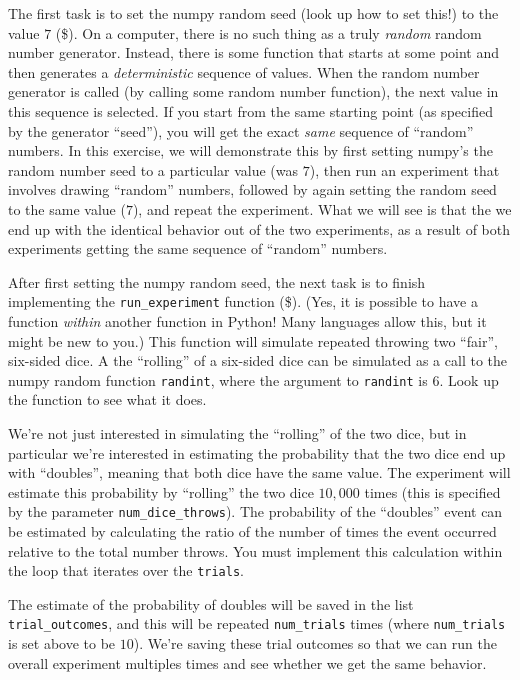 \documentclass[10pt]{article}
\begin{document}
\begin{enumerate}
The first task is to set the numpy random seed (look up how to set this!) to the value $7$ (\$). On a computer, there is no such thing as a truly {\em random} random number generator. Instead, there is some function that starts at some point and then generates a {\em deterministic} sequence of values. When the random number generator is called (by calling some random number function), the next value in this sequence is selected. If you start from the same starting point (as specified by the generator ``seed''), you will get the exact {\em same} sequence of ``random'' numbers. In this exercise, we will demonstrate this by first setting numpy's the random number seed to a particular value (was $7$), then run an experiment that involves drawing ``random'' numbers, followed by again setting the random seed to the same value ($7$), and repeat the experiment. What we will see is that the we end up with the identical behavior out of the two experiments, as a result of both experiments getting the same sequence of ``random'' numbers.

After first setting the numpy random seed, the next task is to finish implementing the {\tt run\_experiment} function (\$). (Yes, it is possible to have a function {\em within} another function in Python! Many languages allow this, but it might be new to you.)
This function will simulate repeated throwing two ``fair'', six-sided dice. A the ``rolling'' of a six-sided dice can be simulated as a call to the numpy random function {\tt randint}, where the argument to {\tt randint} is $6$. Look up the function to see what it does.

We're not just interested in simulating the ``rolling'' of the two dice, but in particular we're interested in estimating the probability that the two dice end up with ``doubles'', meaning that both dice have the same value. The experiment will estimate this probability by ``rolling'' the two dice $10,000$ times (this is specified by the parameter {\tt num\_dice\_throws}). The probability of the ``doubles'' event can be estimated by calculating the ratio of the number of times the event occurred relative to the total number throws. You must implement this calculation within the loop that iterates over the {\tt trials}.

The estimate of the probability of doubles will be saved in the list {\tt trial\_outcomes}, and this will be repeated {\tt num\_trials} times (where {\tt num\_trials} is set above to be $10$). We're saving these trial outcomes so that we can run the overall experiment multiples times and see whether we get the same behavior.


\end{enumerate}
\end{document}
